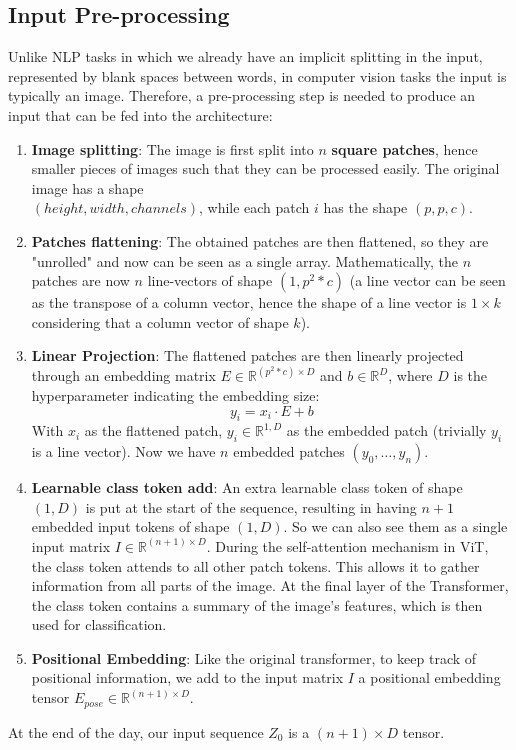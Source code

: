 \documentclass[12pt]{article}
\begin{document}
\subsection{Input Pre-processing}
Unlike NLP tasks in which we already have an implicit splitting in the input, represented by blank spaces 
between words, in computer vision tasks the input is typically an image. Therefore, a pre-processing step is 
needed to produce an input that can be fed into the architecture:
\begin{enumerate}
    \item \textbf{Image splitting}: The image is first split into $n$ \textbf{square patches}, hence smaller pieces of 
    images such that they can be processed easily. The original image has a shape \\$(height, width, channels)$, 
    while each patch $i$ has the shape $(p, p, c)$.
    
    \item \textbf{Patches flattening}: The obtained patches are then flattened, so they are "unrolled" and 
    now can be seen as a single array. Mathematically, the $n$ patches are now $n$ line-vectors of shape 
    $(1, p^2 * c)$ (a line vector can be seen as the transpose of a column vector, hence the shape of a line 
    vector is $1 \times k$ considering that a column vector of shape $k$).

    \item \textbf{Linear Projection}: The flattened patches are then linearly projected through an embedding 
    matrix $E \in \mathbb{R}^{(p^2 * c) \times D}$ and $b \in \mathbb{R}^D$, where $D$ is the hyperparameter indicating the 
    embedding size:
    \begin{equation}
        y_i = x_i \cdot E + b
    \end{equation}
    With $x_i$ as the flattened patch, $y_i \in \mathbb{R}^{1,D}$ as the embedded patch (trivially $y_i$ is a line 
    vector). Now we have $n$ embedded patches $(y_0, \dots, y_n)$.

    \item \textbf{Learnable class token add}: An extra learnable class token of shape $(1,D)$ is put at the start of 
    the sequence, resulting in having $n+1$ embedded input tokens of shape $(1,D)$. So we can also see them as 
    a single input matrix $I \in \mathbb{R}^{(n+1) \times D}$. During the self-attention mechanism in 
    ViT, the class token attends to all other patch tokens. This allows it to gather information from all 
    parts of the image. At the final layer of the Transformer, the class token contains a summary of the image's features, 
    which is then used for classification.

    \item \textbf{Positional Embedding}: Like the original transformer, to keep track of positional information, 
    we add to the input matrix $I$ a positional embedding tensor $E_{pose} \in \mathbb{R}^{(n+1) \times D}$.
\end{enumerate}
At the end of the day, our input sequence $Z_0$ is a $(n+1) \times D$ tensor.
\end{document}
